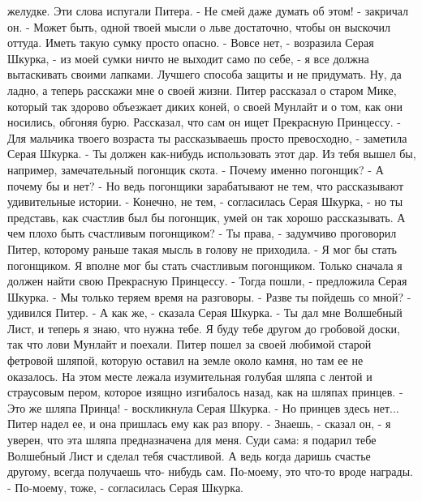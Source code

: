 желудке.
    Эти слова испугали Питера.
    - Не смей даже думать об этом! - закричал он. - Может быть, одной 
твоей мысли о льве достаточно, чтобы он выскочил оттуда. Иметь такую 
сумку просто опасно.
    - Вовсе нет, - возразила Серая Шкурка, - из моей сумки ничто не 
выходит само по себе, - я все должна вытаскивать своими лапками. 
Лучшего способа защиты и не придумать. Ну, да ладно, а теперь расскажи 
мне о своей жизни.
    Питер рассказал о старом Мике, который так здорово объезжает диких 
коней, о своей Мунлайт и о том, как они носились, обгоняя бурю. 
Рассказал, что сам он ищет Прекрасную Принцессу.
    - Для мальчика твоего возраста ты рассказываешь просто 
превосходно, - заметила Серая Шкурка. - Ты должен как-нибудь 
использовать этот дар. Из тебя вышел бы, например, замечательный 
погонщик скота.
    - Почему именно погонщик?
    - А почему бы и нет?
    - Но ведь погонщики зарабатывают не тем, что рассказывают 
удивительные истории.
    - Конечно, не тем, - согласилась Серая Шкурка, - но ты представь, 
как счастлив был бы погонщик, умей он так хорошо рассказывать. А чем 
плохо быть счастливым погонщиком?
    - Ты права, - задумчиво проговорил Питер, которому раньше такая 
мысль в голову не приходила. - Я мог бы стать погонщиком. Я вполне мог 
бы стать счастливым погонщиком. Только сначала я должен найти свою 
Прекрасную Принцессу.
    - Тогда пошли, - предложила Серая Шкурка. - Мы только теряем время 
на разговоры.
    - Разве ты пойдешь со мной? - удивился Питер.
    - А как же, - сказала Серая Шкурка. - Ты дал мне Волшебный Лист, и 
теперь я знаю, что нужна тебе. Я буду тебе другом до гробовой доски, 
так что лови Мунлайт и поехали.
    Питер пошел за своей любимой старой фетровой шляпой, которую 
оставил на земле около камня, но там ее не оказалось. На этом месте 
лежала изумительная голубая шляпа с лентой и страусовым пером, которое 
изящно изгибалось назад, как на шляпах принцев.
    - Это же шляпа Принца! - воскликнула Серая Шкурка. - Но принцев 
здесь нет...
    Питер надел ее, и она пришлась ему как раз впору.
    - Знаешь, - сказал он, - я уверен, что эта шляпа предназначена для 
меня. Суди сама: я подарил тебе Волшебный Лист и сделал тебя 
счастливой. А ведь когда даришь счастье другому, всегда получаешь что-
нибудь сам. По-моему, это что-то вроде награды.
    - По-моему, тоже, - согласилась Серая Шкурка.